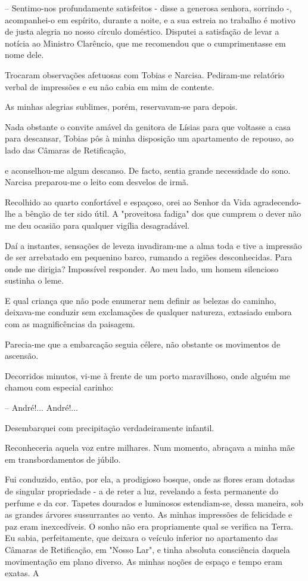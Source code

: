 \documentclass[portuguese,12pt,a4paper]{scrbook}
\begin{document}
	– Sentimo-nos profundamente satisfeitos - disse a generosa senhora, sorrindo -, acompanhei-o em espírito, durante a noite, e a sua estreia no trabalho é motivo de justa alegria no nosso círculo doméstico. Disputei a satisfação de levar a notícia ao Ministro Clarêncio, que me recomendou que o cumprimentasse em nome dele.
	
	Trocaram observações afetuosas com Tobias e Narcisa. Pediram-me relatório verbal de impressões e eu não cabia em mim de contente.
	
	As minhas alegrias sublimes, porém, reservavam-se para depois.
	
	Nada obstante o convite amável da genitora de Lísias para que voltasse a casa para descansar, Tobias pôs à minha disposição um apartamento de repouso, ao lado das Câmaras de Retificação,
	
	
	e aconselhou-me algum descanso. De facto, sentia grande necessidade do sono. Narcisa preparou-me o leito com desvelos de irmã.
	
	Recolhido ao quarto confortável e espaçoso, orei ao Senhor da Vida agradecendo-lhe a bênção de ter sido útil. A "proveitosa fadiga" dos que cumprem o dever não me deu ocasião para qualquer vigília desagradável.
	
	Daí a instantes, sensações de leveza invadiram-me a alma toda e tive a impressão de ser arrebatado em pequenino barco, rumando a regiões desconhecidas. Para onde me dirigia? Impossível responder. Ao meu lado, um homem silencioso sustinha o leme.
	
	E qual criança que não pode enumerar nem definir as belezas do caminho, deixava-me conduzir sem exclamações de qualquer natureza, extasiado embora com as magnificências da paisagem.
	
	Parecia-me que a embarcação seguia célere, não obstante os movimentos de ascensão.
	
	Decorridos minutos, vi-me à frente de um porto maravilhoso, onde alguém me chamou com especial carinho:
	
	– André!... André!...
	
	Desembarquei com precipitação verdadeiramente infantil.
	
	Reconheceria aquela voz entre milhares. Num momento, abraçava a minha mãe em transbordamentos de júbilo.
	
	Fui conduzido, então, por ela, a prodigioso bosque, onde as flores eram dotadas de singular propriedade - a de reter a luz, revelando a festa permanente do perfume e da cor. Tapetes dourados e luminosos estendiam-se, dessa maneira, sob as grandes árvores sussurrantes ao vento. As minhas impressões de felicidade e paz eram inexcedíveis. O sonho não era propriamente qual se verifica na Terra. Eu sabia, perfeitamente, que deixara o veículo inferior no apartamento das Câmaras de Retificação, em "Nosso Lar", e tinha absoluta consciência daquela movimentação em plano diverso. As minhas noções de espaço e tempo eram exatas. A
	
\end{document}
